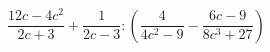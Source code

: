 \begin{ex}[type=expression]
	\begin{condition}
		\( \dfrac{12c-4c^2}{2c+3}+\dfrac{1}{2c-3}:\left( \dfrac{4}{4c^2-9} -\dfrac{6c-9}{8c^3+27}\right) \)
	\end{condition}
\end{ex}